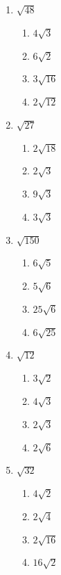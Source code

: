 \documentclass{hw}
\begin{document}
\begin{enumerate}[label=\alph*.]
    \item $\sqrt{48}$
        \begin{enumerate}[label=\Alph*.]
            \item $4\sqrt{3}$
            \item $6\sqrt{2}$
            \item $3\sqrt{16}$
            \item $2\sqrt{12}$
        \end{enumerate}
        \studentworkspace
    \item $\sqrt{27}$
        \begin{enumerate}[label=\Alph*.]
            \item $2\sqrt{18}$
            \item $2\sqrt{3}$
            \item $9\sqrt{3}$
            \item $3\sqrt{3}$
        \end{enumerate}
        \studentworkspace
    \item $\sqrt{150}$
        \begin{enumerate}[label=\Alph*.]
            \item $6\sqrt{5}$
            \item $5\sqrt{6}$
            \item $25\sqrt{6}$
            \item $6\sqrt{25}$
        \end{enumerate}
        \studentworkspace
    \item $\sqrt{12}$
        \begin{enumerate}[label=\Alph*.]
            \item $3\sqrt{2}$
            \item $4\sqrt{3}$
            \item $2\sqrt{3}$
            \item $2\sqrt{6}$
        \end{enumerate}
        \studentworkspace
    \item $\sqrt{32}$
        \begin{enumerate}[label=\Alph*.]
            \item $4\sqrt{2}$
            \item $2\sqrt{4}$
            \item $2\sqrt{16}$
            \item $16\sqrt{2}$
        \end{enumerate}

\end{enumerate}
\end{document}
